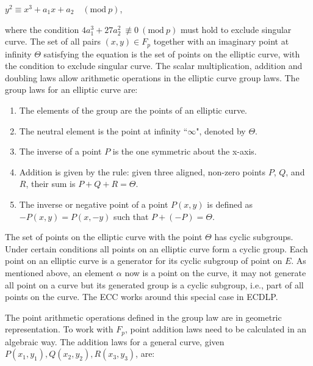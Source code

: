 \begin{center}
  $y^2 \equiv x^3 + a_1x + a_2 \quad (\text{mod} \ p)$,
\end{center}


where the condition $4a_1^3 + 27a_2^2 \ \not\equiv 0 \ (\text{mod} \ p)$ must hold to exclude singular curve. The set of all pairs $(x,y) \in F_p$ together with an imaginary point at infinity $\Theta$ satisfying the equation is the set of points on the elliptic curve, with the condition to exclude singular curve. The scalar multiplication, addition and doubling laws allow arithmetic operations in the elliptic curve group laws. The group laws for an elliptic curve are:

\begin{enumerate}
  \item The elements of the group are the points of an elliptic curve.
  \item The neutral element is the point at infinity ``$\infty$", denoted by $\Theta$.
  \item The inverse of a point $P$ is the one symmetric about the x-axis.
  \item Addition is given by the rule: given three aligned, non-zero points $P$, $Q$, and $R$, their sum is $P + Q + R = \Theta$.
  \item The inverse or negative point of a point $P(x,y)$ is defined as $-P(x,y) = P(x,-y)$ such that $P + (-P) = \Theta$.
\end{enumerate}

The set of points on the elliptic curve with the point $\Theta$ has cyclic subgroups. Under certain conditions all points on an elliptic curve form a cyclic group. Each point on an elliptic curve is a generator for its cyclic subgroup of point on $E$. As mentioned above, an element $\alpha$ now is a point on the curve, it may not generate all point on a curve but its generated group is a cyclic subgroup, i.e., part of all points on the curve. The ECC works around this special case in ECDLP.

The point arithmetic operations defined in the group law are in geometric representation. To work with $F_p$, point addition laws need to be calculated in an algebraic way. The addition laws for a general curve, given $P(x_1, y_1), Q(x_2, y_2), R(x_3, y_3)$, are:

